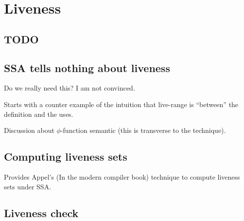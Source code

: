 \chapter{Liveness }
\section{TODO}

\section{SSA tells nothing about liveness}
Do we really need this? I am not convinced.

Starts with a counter example of the intuition that live-range is ``between'' the definition and the uses. 

Discussion about $\phi$-function semantic (this is transverse to the technique).

\section{Computing liveness sets}
Provides Appel's (In the modern compiler book) technique to compute liveness sets under SSA.

\section{Liveness check}

